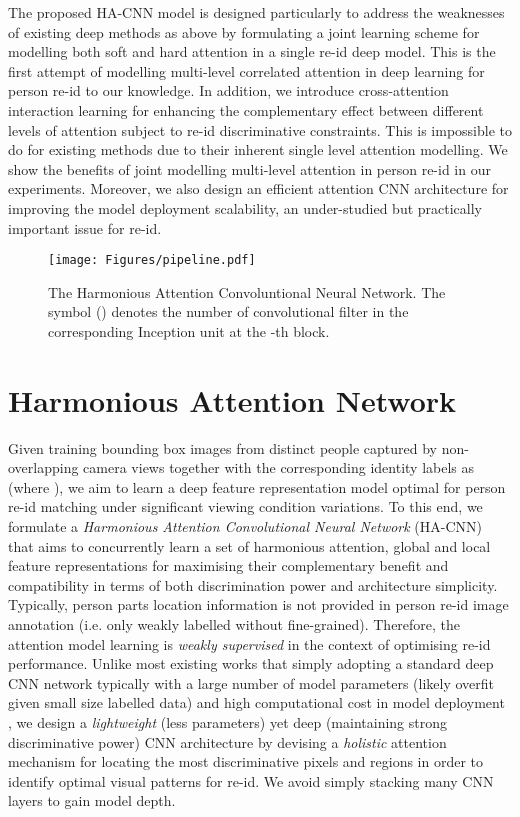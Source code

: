 \documentclass[10pt,twocolumn,letterpaper]{article}
\begin{document}
The proposed HA-CNN model is designed particularly to
address the weaknesses of existing deep methods as above
by formulating a joint learning scheme for modelling both soft and hard attention
in a single re-id deep model.
This is the first attempt of modelling multi-level correlated attention in deep learning
for person re-id to our knowledge.
In addition, we introduce cross-attention interaction learning for enhancing the complementary
effect between different levels of attention subject to re-id
discriminative constraints. This is impossible to do for existing
methods due to their inherent single level attention modelling. We
show the benefits of joint modelling multi-level attention in person
re-id in our experiments. Moreover, we also design an efficient attention CNN architecture for 
improving the model deployment scalability,
an under-studied but practically important issue for re-id.





\begin{figure*} [h]\centering
\texttt{[image: Figures/pipeline.pdf]}
\caption{ The Harmonious Attention Convoluntional Neural Network.
	The symbol  () denotes the number of convolutional filter in the corresponding Inception unit at the -th block.
	}
	\label{fig:pipline}
	\vspace{-0.5cm}
\end{figure*}



\section{Harmonious Attention Network}

Given  training bounding box images   
from  distinct people captured by non-overlapping camera views together with the corresponding identity labels as 
(where ), 
we aim to learn a deep feature representation model optimal for person re-id matching under significant viewing condition variations. To this end, we formulate a {\em Harmonious Attention Convolutional Neural Network} (HA-CNN) 
that aims to concurrently learn a set of harmonious attention, global and local feature representations for maximising their complementary benefit and compatibility 
in terms of both discrimination power and architecture simplicity.
Typically, person parts location information is not provided in person
re-id image annotation (i.e. only weakly labelled without fine-grained).
Therefore, the attention model learning is {\em weakly supervised}
in the context of optimising re-id performance.
Unlike most existing works that simply adopting a standard deep CNN
network typically with a large number of model parameters (likely
overfit given small size labelled data) and high
computational cost in model deployment
\cite{krizhevsky2012imagenet,simonyan2014very,szegedy2015going,he2016deep}, 
we design a {\em lightweight} (less parameters) yet deep (maintaining strong
discriminative power) CNN architecture by
devising a {\em holistic} attention mechanism for
locating the most discriminative pixels and regions in order to identify
optimal visual patterns for re-id. We avoid simply
stacking many CNN layers to gain model depth. 
\end{document}
